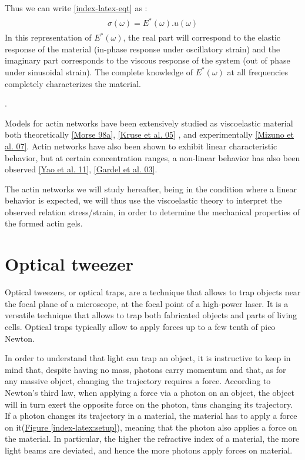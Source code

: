 \documentclass[A4paperpaper,11pt,english]{sphinxmanual}
\begin{document}
Thus we can write \eqref{index-latex-eqt} as :
\label{index-latex:equation-eqa17}\begin{gather}
\begin{split}\sigma(\omega) = E^*(\omega).u(\omega)\end{split}\label{index-latex-eqa17}
\end{gather}
In this representation of \(E^*(\omega)\), the real part will correspond to
the elastic response of the material (in-phase response
under oscillatory strain) and the imaginary part corresponds to the viscous response
of the system (out of phase under sinusoidal strain). The complete knowledge of
\(E^*(\omega)\) at all frequencies completely characterizes the material.

.

Models for actin networks have been extensively studied as viscoelastic material
both theoretically {\hyperref[index-latex:morse1998a]{{[}Morse 98a{]}}}, {\hyperref[index-latex:kruse2005]{{[}Kruse et al. 05{]}}} , and  experimentally
{\hyperref[index-latex:mizuno2007]{{[}Mizuno et al. 07{]}}}. Actin networks have also been shown to exhibit linear characteristic behavior,
but at certain concentration ranges, a non-linear behavior has also been observed {\hyperref[index-latex:yao2011]{{[}Yao et al. 11{]}}}, {\hyperref[index-latex:gardel2003]{{[}Gardel et al. 03{]}}}.

The actin networks we will study hereafter, being in the condition where a linear behavior is expected, we will thus use the viscoelastic theory to interpret the
observed relation stress/strain, in order to determine the mechanical properties
of the formed actin gels.


\section{Optical tweezer}
\label{index-latex:optical-tweezer}\label{index-latex:id77}
Optical tweezers, or optical traps, are a technique that allows to trap objects
near the focal plane of a microscope, at the focal point of a high-power laser.
It is a versatile technique that allows to trap both fabricated objects and
parts of living cells. Optical traps typically allow to apply forces up to a few tenth of
pico Newton.

In order to understand that light can trap an object, it is instructive to keep in mind
that, despite having no mass, photons carry momentum and that, as for any massive
object, changing the trajectory requires a force.  According to Newton's third
law, when applying a force via a photon on an object, the object will in turn
exert the opposite force on the photon, thus changing its trajectory. If a photon changes its trajectory in a material, the material has to apply a
force on it(\hyperref[index-latex:setup]{Figure  \ref*{index-latex:setup}}), meaning that the photon also applies a force on the
material. In particular, the higher the refractive index of a material, the
more light beams are deviated, and hence the more photons apply forces on
material.
\end{document}
